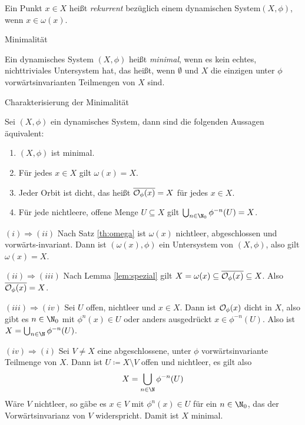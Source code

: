 \begin{definition}
  Ein Punkt $x\in X$ heißt \emph{rekurrent} bezüglich einem dynamischen System$(X,\phi)$, wenn $x \in \omega(x)$.  
\end{definition}
\begin{definition}Minimalität

Ein dynamisches System $(X, \phi)$ heißt \emph{minimal}, wenn es kein echtes, nichttriviales Untersystem hat, das heißt, wenn $\emptyset$ und $X$ die einzigen unter $\phi$ vorwärtsinvarianten Teilmengen von $X$ sind.
\end{definition}
\begin{lemma}Charakterisierung der Minimalität

Sei $(X, \phi)$ ein dynamisches System, dann sind die folgenden Aussagen äquivalent:
\renewcommand{\labelenumi}{(\alph{enumi})}
\begin{enumerate}
\item $(X, \phi)$ ist minimal.
\item Für jedes $x \in X$ gilt $\omega(x) = X$.
\item Jeder Orbit ist dicht, das heißt $\overline{{\cal O}_\phi(x)} = X$ für jedes $x \in X$.
\item Für jede nichtleere, offene Menge $U \subseteq X$ gilt $\bigcup_{n \in \N_0} \phi^{-n}(U) = X$.
\end{enumerate}
\end{lemma}
\begin{beweis}
{$(i) \Rightarrow (ii)$} 
Nach Satz \ref{th:omega} ist $\omega(x)$ nichtleer, abgeschlossen und vorwärts-invariant. Dann ist $(\omega(x), \phi)$ ein Untersystem von $(X, \phi)$, also gilt $\omega(x) = X$.

{$(ii) \Rightarrow (iii)$} Nach Lemma \ref{lem:spezial} gilt $X = \omega(x) \subseteq \overline{{\cal O}_\phi(x)} \subseteq X$. Also $\overline{{\cal O}_\phi(x)} = X$.

  {$(iii) \Rightarrow (iv)$} Sei $U$ offen, nichtleer und $x \in X$. Dann ist ${\cal O}_\phi (x)$ dicht in $X$, also gibt es $n \in \N_0$ mit $\phi^n(x) \in U$ oder anders ausgedrückt $x \in \phi^{-n}(U)$. Also ist $X = \bigcup_{n \in \N}\phi^{-n}(U)$. 

  {$(iv) \Rightarrow (i)$} Sei $V \neq X$ eine abgeschlossene, unter $\phi$ vorwärtsinvariante Teilmenge von $X$. Dann ist $U \coloneqq X \setminus V $ offen und nichtleer, es gilt also 
  \begin{align*}
    X = \bigcup_{n \in \N} \phi^{-n}(U)
  \end{align*}
Wäre $V$ nichtleer, so gäbe es $x \in V$ mit $\phi^{n}(x)\in U$ für ein $n \in \N_0$, das der Vorwärtsinvarianz von $V$ widerspricht. Damit ist $X$ minimal.
\end{beweis}